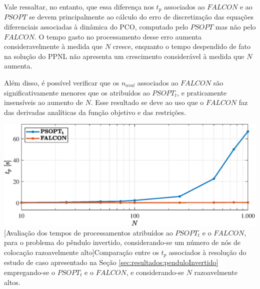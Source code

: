 Vale ressaltar, no entanto, que essa diferença nos $ t_p $ associados ao $ FALCON $ e ao $ PSOPT $ se devem principalmente ao cálculo do erro de discretização das equações diferenciais associadas à dinâmica do PCO, computado pelo $ PSOPT $ mas não pelo $ FALCON $. O tempo gasto no processamento desse erro aumenta consideravelmente à medida que $ N $ cresce, enquanto o tempo despendido de fato na solução do PPNL não apresenta um crescimento considerável à medida que $ N $ aumenta.  

Além disso, é possível verificar que os $ n_{aval} $ associados ao $ FALCON $ são significativamente menores que os atribuídos ao $ PSOPT_t $, e praticamente insensíveis ao aumento de $ N $. Esse resultado se deve ao uso que o $ FALCON $ faz das derivadas analíticas da função objetivo e das restrições. 

\noindent	
\begin{minipage}{\textwidth}
	\vspace{\onelineskip}
	\centering
	\includegraphics[width=1\linewidth]{fig/resultados/obs/bigN/Nxt}
	[Avaliação dos tempos de processamentos atribuídos ao $ PSOPT_t $ e o $ FALCON $, para o problema do pêndulo invertido, considerando-se um número de nós de colocação razoavelmente alto]{Comparação entre os $ t_p $ associados à resolução do estudo de caso apresentado na Seção \ref{sec:resultados:penduloInvertido} empregando-se o $ PSOPT_t $ e o $ FALCON $, e considerando-se $ N $ razoavelmente altos.}
	\label{fig:resultados:conclusao:Nxt}
	\vspace{\onelineskip}
\end{minipage}

